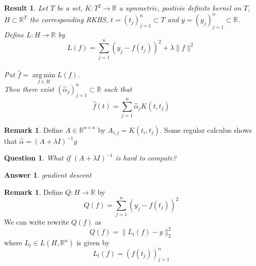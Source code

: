\documentclass[notheorems]{beamer}
\newtheorem{res}[thm]{Result}
\newtheorem{ques}[thm]{Question}
\newtheorem{ans}[thm]{Answer}
\theoremstyle{definition}
\theoremstyle{definition}
\newtheorem{rem}[definition]{Remark}
\newcommand{\al}{\alpha}
\newcommand{\lam}{\lambda}
\newcommand{\R}{\mathbb{R}}
\DeclareMathOperator*{\argmin}{arg\,min}
\begin{document}
\begin{frame}
\begin{res}
Let $T$ be a set, $K : T^2 \rightarrow \R$ a symmetric, postivie definite kernel on $T$, $H \subset \R^T$ the corresponding RKHS, $t = (t_j)_{j=1}^n \subset T$ and $y = (y_j)_{j=1}^n \subset \R$. \\
\pause
Define $L: H \rightarrow \R$ by $$L(f) = \sum_{j=1}^n (y_j - f(t_j) )^2 + \lam \|f\|^2$$ \\
\pause 
Put $\hat{f} = \argmin\limits_{f \in H}L(f)$. 
\\
\pause 
Then there exist $(\hat{\al}_j)_{j=1}^n \subset \R$ such that $$\hat{f}(t) = \sum_{j=1}^n \hat{\al}_jK(t, t_j)$$
\end{res}
\end{frame}















\begin{frame}
\begin{rem}
Define $A \in \R^{n \times n}$ by $A_{i,j} = K(t_i, t_j)$. Some regular calculus shows that $\hat{\al} = (A + \lam I)^{-1}y$
\end{rem}
\pause

\begin{ques}
What if $(A + \lam I)^{-1}$ is hard to compute? 
\pause
\end{ques}

\begin{ans}
gradient descent
\end{ans}
\end{frame}















\begin{frame}
\begin{rem}
Define $Q: H \rightarrow \R$ by $$Q(f) = \sum_{j=1}^n (y_j - f(t_j) )^2$$ 
\pause
We can write rewrite $Q(f)$ as  $$Q(f) = \|L_t(f) - y\|_2^2$$ where $L_t \in L(H, \R^n)$ is given by $$L_t(f) = (f(t_j))_{j=1}^n$$ 
\end{rem}
\end{frame}
\end{document}
